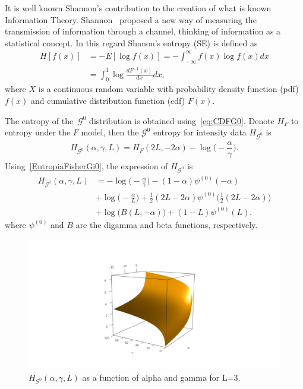 \documentclass[journal]{IEEEtran}
\begin{document}
	It is well known Shannon's contribution to the creation of what is known Information Theory. 
	Shannon~\cite{Shannon1948} proposed a new way of
	measuring the transmission of information through a channel, thinking of information as a statistical concept. 
	In this regard Shanon's entropy (SE) is defined as
	\begin{align}
		\label{SE}
		H[f(x)]&=-E[\log f(x)]=-\int_{-\infty}^{\infty} f(x) \log f(x) d x\\
		&= \int_{0}^{1} \log \frac{d F^{-1}(x)}{d x} d x,
	\end{align}
	where $X$ is a continuous random variable with probability density function (pdf) $f(x)$ and
	cumulative distribution function (cdf) $F(x)$. 
	
	The entropy of the~$\mathcal{G}^0$ distribution is obtained using~\eqref{eq:CDFG0}.
	Denote $H_{F}$ to entropy under the $F$ model, then the $\mathcal{G}^0$ entropy for intensity data $H_{\mathcal G^0}$ is 
	\begin{align}
		\label{EntropiaFisherGi0}
		H_{\mathcal G^0}(\alpha,\gamma,L)=H_{F}(2 L, - 2 \alpha) -\log\Big(-\dfrac{\alpha}{\gamma}\Big).
	\end{align}
	Using~\eqref{EntropiaFisherGi0}, the
	expression of $H_{\mathcal G^0}$ is
	\begin{align}
		\label{EG0}
		H_{\mathcal G^0}(\alpha,\gamma,L)&=-\log \Big(-\frac{\alpha }{\gamma }\Big)-(1-\alpha ) \psi^{(0)}(-\alpha )\\ \nonumber
		&+\log \Big(-\frac{\alpha }{L}\Big)+\frac{1}{2} (2 L-2 \alpha ) \psi ^{(0)}\Big(\frac{1}{2} (2 L-2 \alpha )\Big)\\ \nonumber
		&+\log \big(B(L,-\alpha )\big)+(1-L) \psi^{(0)}(L),
	\end{align}
	where $\psi^{(0)}$ and $B$ are the digamma and beta functions, respectively.
	\begin{figure}[hbt]
		\centering    
		\includegraphics[width=0.6\linewidth]{../../../Figures/CISS2021/HG0L=3_2.pdf}
		\caption{$H_{\mathcal G^0}(\alpha,\gamma,L)$ as a function of alpha and gamma for L=3.\label{figure:HG0}}
	\end{figure}
	
\end{document}
